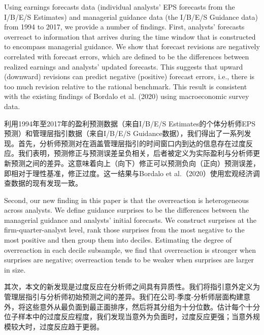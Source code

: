 \documentclass[12pt,a4paper]{article}
\newenvironment{original}
  {\par\medskip\noindent\ignorespaces}
  {\par\medskip}
\newenvironment{translation}
  {\par\noindent{\color{transblue}\ignorespaces}}
  {\par\bigskip}
\begin{document}
\begin{original}
Using earnings forecasts data (individual analysts' EPS forecasts from the I/B/E/S Estimates) and managerial guidance data (the I/B/E/S Guidance data) from 1994 to 2017, we provide a number of findings. First, analysts' forecasts overreact to information that arrives during the time window that is constructed to encompass managerial guidance. We show that forecast revisions are negatively correlated with forecast errors, which are defined to be the differences between realized earnings and analysts' updated forecasts. This suggests that upward (downward) revisions can predict negative (positive) forecast errors, i.e., there is too much revision relative to the rational benchmark. This result is consistent with the existing findings of Bordalo et al. (2020) using macroeconomic survey data.
\end{original}
\begin{translation}
利用1994年至2017年的盈利预测数据（来自I/B/E/S Estimates的个体分析师EPS预测）和管理层指引数据（来自I/B/E/S Guidance数据），我们得出了一系列发现。首先，分析师预测对在涵盖管理层指引的时间窗口内到达的信息存在过度反应。我们表明，预测修正与预测误差呈负相关，后者被定义为实际盈利与分析师更新预测之间的差异。这意味着向上（向下）修正可以预测负向（正向）预测误差，即相对于理性基准，修正过度。这一结果与Bordalo et al.（2020）使用宏观经济调查数据的现有发现一致。
\end{translation}

\begin{original}
Second, our new finding in this paper is that the overreaction is heterogeneous across analysts. We define guidance surprises to be the differences between the managerial guidance and analysts' initial forecasts. We construct surprises at the firm-quarter-analyst level, rank those surprises from the most negative to the most positive and then group them into deciles. Estimating the degree of overreaction in each decile subsample, we find that overreaction is stronger when surprises are negative; overreaction tends to be weaker when surprises are larger in size.
\end{original}
\begin{translation}
其次，本文的新发现是过度反应在分析师之间具有异质性。我们将指引意外定义为管理层指引与分析师初始预测之间的差异。我们在公司-季度-分析师层面构建意外，将这些意外从最负面到最正面排序，然后将其分组为十分位数。估计每个十分位子样本中的过度反应程度，我们发现当意外为负面时，过度反应更强；当意外规模较大时，过度反应趋于更弱。
\end{translation}
\end{document}
